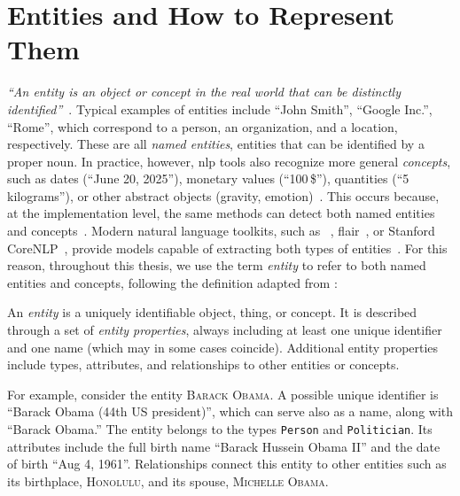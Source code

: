 \section{Entities and How to Represent Them}
\label{back:entities}

\textit{``An entity is an object or concept in the real world that can be distinctly identified''}~\cite{entityorientedsearch2018balog}.
Typical examples of entities include ``John Smith'', ``Google Inc.'', ``Rome'', which correspond to a person, an organization, and a location, respectively. These are all \emph{named entities}, \ie entities that can be identified by a proper noun.
In practice, however, \acl{nlp} tools also recognize more general \emph{concepts}, such as dates (\eg ``June 20, 2025''), monetary values (\eg ``100\,\$''), quantities (\eg ``5 kilograms''), or other abstract objects (\eg gravity, emotion)~\cite{muc6_overview_1995}.
This occurs because, at the implementation level, the same methods can detect both named entities and concepts~\cite{entityorientedsearch2018balog}. Modern natural language toolkits, such as \spacy~\cite{honnibal2020spacy}, flair~\cite{akbik-etal-2019-flair}, or Stanford CoreNLP~\cite{manning-EtAl:2014:P14-5}, provide models capable of extracting both types of entities~\cite{spacy-ner-labels,flair-ner-ontonotes,stanfordnlp-ner}. For this reason, throughout this thesis, we use the term \emph{entity} to refer to both named entities and concepts, following the definition adapted from \textcite{entityorientedsearch2018balog}:
\begin{definition}[Entity]
An \emph{entity} is a uniquely identifiable object, thing, or concept. 
It is described through a set of \emph{entity properties}, always including 
at least one unique identifier and one name (which may in some cases coincide). 
Additional entity properties include types, attributes, and 
relationships to other entities or concepts.
\end{definition}

For example, consider the entity \textsc{Barack Obama}. 
A possible unique identifier is ``Barack Obama (44th US president)'', which can serve also as a name, along with ``Barack Obama.'' 
The entity belongs to the types \texttt{Person} and \texttt{Politician}. 
Its attributes include the full birth name ``Barack Hussein Obama II'' and the date of birth ``Aug 4, 1961''. 
Relationships connect this entity to other entities such as its birthplace, \textsc{Honolulu}, and its spouse, \textsc{Michelle Obama}.

